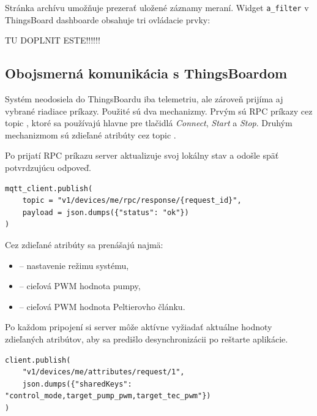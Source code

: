Stránka archívu umožňuje prezerať uložené záznamy meraní. 
Widget \texttt{a\_filter} v ThingsBoard dashboarde obsahuje tri ovládacie prvky:

TU DOPLNIT ESTE!!!!!!

\begin{figure}[H]
    \centering
    \label{fig:thingsboard_archiv}
\end{figure}

\subsection{Obojsmerná komunikácia s ThingsBoardom}

Systém neodosiela do ThingsBoardu iba telemetriu, ale zároveň prijíma aj vybrané riadiace 
príkazy. Použité sú dva mechanizmy. Prvým sú RPC príkazy cez topic 
, ktoré sa používajú hlavne pre tlačidlá 
\textit{Connect}, \textit{Start} a \textit{Stop}. Druhým mechanizmom sú zdieľané atribúty cez 
topic .

Po prijatí RPC príkazu server aktualizuje svoj lokálny stav a odošle späť potvrdzujúcu odpoveď.

\begin{lstlisting}[caption={Príklad odpovede na RPC príkaz z ThingsBoardu}]
mqtt_client.publish(
    topic = "v1/devices/me/rpc/response/{request_id}",
    payload = json.dumps({"status": "ok"})
)
\end{lstlisting}

Cez zdieľané atribúty sa prenášajú najmä:

\begin{itemize}
    \item {} -- nastavenie režimu systému,
    \item {} -- cieľová PWM hodnota pumpy,
    \item {} -- cieľová PWM hodnota Peltierovho článku.
\end{itemize}

Po každom pripojení si server môže aktívne vyžiadať aktuálne hodnoty zdieľaných atribútov, aby 
sa predišlo desynchronizácii po reštarte aplikácie.

\begin{lstlisting}[caption={Vyžiadanie aktuálnych zdieľaných atribútov}]
client.publish(
    "v1/devices/me/attributes/request/1",
    json.dumps({"sharedKeys": "control_mode,target_pump_pwm,target_tec_pwm"})
)
\end{lstlisting}

